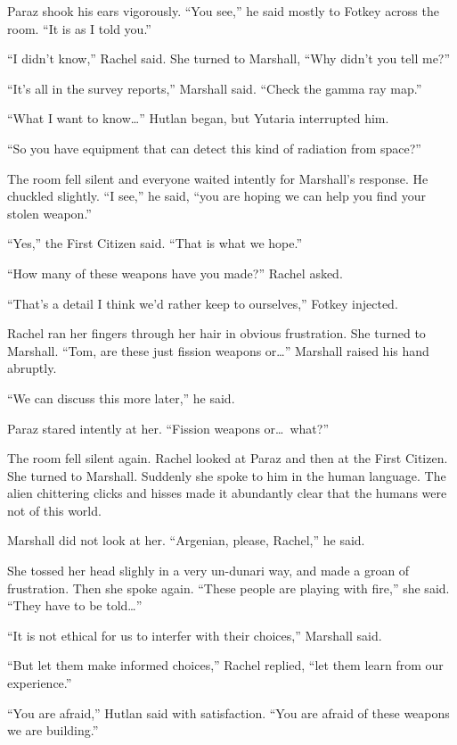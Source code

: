Paraz shook his ears vigorously. ``You see,'' he said mostly to Fotkey across the room. ``It is
as I told you.''

``I didn't know,'' Rachel said. She turned to Marshall, ``Why didn't you tell me?''

``It's all in the survey reports,'' Marshall said. ``Check the gamma ray map.''

``What I want to know\ldots'' Hutlan began, but Yutaria interrupted him.

``So you have equipment that can detect this kind of radiation from space?''

The room fell silent and everyone waited intently for Marshall's response. He chuckled slightly.
``I see,'' he said, ``you are hoping we can help you find your stolen weapon.''

``Yes,'' the First Citizen said. ``That is what we hope.''

``How many of these weapons have you made?'' Rachel asked.

``That's a detail I think we'd rather keep to ourselves,'' Fotkey injected.

Rachel ran her fingers through her hair in obvious frustration. She turned to Marshall. ``Tom,
are these just fission weapons or\ldots'' Marshall raised his hand abruptly.

``We can discuss this more later,'' he said.

Paraz stared intently at her. ``Fission weapons or\ldots\ what?''

The room fell silent again. Rachel looked at Paraz and then at the First Citizen. She turned to
Marshall. Suddenly she spoke to him in the human language. The alien chittering clicks and
hisses made it abundantly clear that the humans were not of this world.

Marshall did not look at her. ``Argenian, please, Rachel,'' he said.

She tossed her head slighly in a very un-dunari way, and made a groan of frustration. Then she
spoke again. ``These people are playing with fire,'' she said. ``They have to be told\ldots''

``It is not ethical for us to interfer with their choices,'' Marshall said.

``But let them make informed choices,'' Rachel replied, ``let them learn from our experience.''

``You are afraid,'' Hutlan said with satisfaction. ``You are afraid of these weapons we are
building.''

